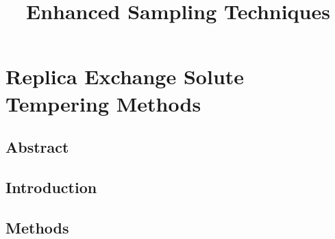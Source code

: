\documentclass{memoir}
\title{Enhanced Sampling Techniques}
\begin{document}
\date{}

\maketitle

\tableofcontents

\chapter{Replica Exchange Solute Tempering Methods}

\section{Abstract}


\section{Introduction}




\section{Methods}







\end{document}
